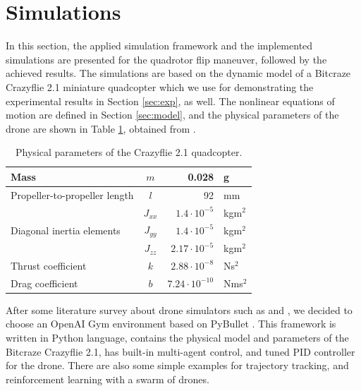 \section{Simulations}

In this section, the applied simulation framework and the implemented simulations are presented for the quadrotor flip maneuver, followed by the achieved results. The simulations are based on the dynamic model of a Bitcraze Crazyflie 2.1 miniature quadcopter which we use for demonstrating the experimental results in Section \ref{sec:exp}, as well. The nonlinear equations of motion are defined in Section \ref{sec:model}, and the physical parameters of the drone are shown in Table \ref{tab:params}, obtained from \cite{Forster}.

\begin{table}[!b]
    \centering
    \setlength{\tabcolsep}{1.5pt}
    \caption{Physical parameters of the Crazyflie 2.1 quadcopter.}
    \label{tab:params}
    \begin{tabular}{|l|c|rl|}
        \hline
        \phantom{o}Mass &\phantom{o} $m$ \phantom{o}& 0.028&g \\
        \hline
        \phantom{o}Propeller-to-propeller length \phantom{o}&\phantom{o} $l$\phantom{o} & 92&mm\\
        \hline
        \multirow{3}{*}{\phantom{o}Diagonal inertia elements} & \phantom{o}$J_{xx}$\phantom{o} & $1.4\cdot 10^{-5}$&kgm$^2$\\
         \cline{2-4}
        &\phantom{o} $J_{yy}$ \phantom{o}& $1.4\cdot 10^{-5}$&kgm$^2$\\
        \cline{2-4}
        & \phantom{o}$J_{zz}$\phantom{o} & \phantom{o}$2.17\cdot 10^{-5}$&kgm$^2$\phantom{o}\\
        \hline
        \phantom{o}Thrust coefficient & $k$ & $2.88\cdot 10^{-8}$ & Ns$^2$\\
        \hline
        \phantom{o}Drag coefficient & $b$ & \phantom{o}$7.24\cdot 10^{-10}$ & Nms$^2$\phantom{o}\\
        \hline
    \end{tabular}
\end{table}

After some literature survey about drone simulators such as \cite{airsim2017} and \cite{flightmare2020}, we decided to choose an OpenAI Gym environment based on PyBullet \cite{gym}. This framework is written in Python language, contains the physical model and parameters of the Bitcraze Crazyflie 2.1, has built-in multi-agent control, and tuned PID controller for the drone. There are also some simple examples for trajectory tracking, and reinforcement learning with a swarm of drones.

